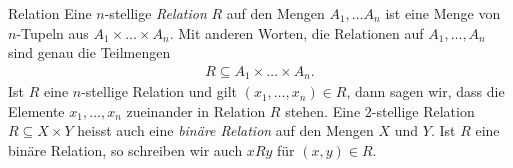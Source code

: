 \begin{definition}{Relation}
Eine $n$-stellige \textit{Relation} $R$ auf den Mengen $A_1,\dots A_n$ ist eine Menge von $n$-Tupeln aus $A_1\times\dots \times A_n$. Mit anderen Worten, die Relationen auf $A_1,\dots,A_n$ sind genau die Teilmengen
\begin{align*}
R\subseteq A_1\times\dots \times A_n.
\end{align*}
Ist $R$ eine $n$-stellige Relation und gilt $(x_1,\dots,x_n)\in R$, dann sagen wir, dass die Elemente $x_1,\dots,x_n$ zueinander in Relation $R$ stehen.
\tcblower
Eine $2$-stellige Relation $R\subseteq X\times Y$ heisst auch eine \textit{binäre Relation} auf den Mengen $X$ und $Y$. Ist $R$ eine binäre Relation, so schreiben wir auch $xRy$ für $(x,y)\in R$.
\end{definition}
\begin{comment}
\begin{example}\label{Bsp:Geraden}
    Wir betrachten die Relation $R_1$ von Beispiel~\ref{ex:Beispiel1relationen} auf $\{g,h,p,q,r\}$. Die Geraden $g,h,p,q,r$ sind wie im folgenden Bild gegeben:
    \begin{center}
    \texttt{[image: images/figures/geraden]}
    \end{center}
    Offenbar gelten folgende Beziehungen:
    \begin{itemize}
    \item Die Gerade $g$ steht in Relation $R_1$ zu folgenden Geraden: $g$, $h$.
    \item Die Gerade $h$ steht in Relation $R_1$ zu folgenden Geraden: $g$, $h$.
    \item Die Gerade $p$ steht in Relation $R_1$ zu folgenden Geraden: $p$, $q$.
    \item Die Gerade $q$ steht in Relation $R_1$ zu folgenden Geraden: $p$, $q$.
    \item Die Gerade $r$ steht mit keiner anderen Geraden in Relation $R_1$.
    \end{itemize}
    Als Menge geschrieben, nimmt die Relation $R_1$ also folgende Gestalt an:
    \[
    R_1=\big\{(g,g),(g,h),(h,h),(h,g),(p,p),(p,q),(q,q),(q,p),(r,r)\big\}.
    \]
    Bildlich lässt sich die Relation als Tabelle darstellen:
    \begin{center}
    \begin{tabular}{ c | c c c c c }
    $r$&\xmark&\xmark&\xmark&\xmark&\cmark\\

\end{comment}
